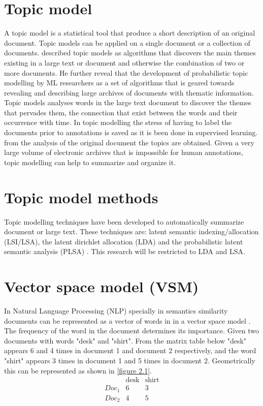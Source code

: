 \section{Topic model}  
A topic model is a statistical tool that produce a short description of an original document. Topic models can be applied on a single document or a collection of documents. \citep{blei2012surveying} described topic models as algorithms that discovers the main themes existing in a large text or document and otherwise the combination of two or more documents. He further reveal that the development of probabilistic topic modelling by ML  researchers as a set of algorithms that is geared towards revealing and describing large archives of documents with thematic information. Topic models analyses words in the large text document to discover the themes that pervades them, the connection that exist between the words and their occurrence with time. In topic modelling the stress of having to label the documents prior to annotations is saved as it is been done in supervised learning. from the analysis of the original document the topics are obtained. Given a very large volume of electronic archives that is impossible for human annotations, topic modelling can help to summarize and organize it.
\section{Topic model methods}
Topic modelling techniques have been developed to automatically summarize document or large text. These techniques are: latent semantic indexing/allocation  (LSI/LSA), the latent dirichlet allocation (LDA) and the probabilistic latent semantic analysis (PLSA) . This research will be restricted to LDA and LSA.
\section{Vector space model (VSM)}

In Natural Language Processing (NLP) specially in semantics similarity documents can be represented as a vector of words in in a vector space model \cite{salton1975vector}. The frequency of the word in the document determines its importance. Given two documents with words  "desk" and "shirt". From the matrix table below "desk" appears 6 and 4 times in document 1 and document 2 respectively, and the word "shirt" appears 3 times in document 1 and 5 times in document 2. Geometrically this can be represented as shown in \eqref{figure 2.1}.
$$\begin{array}{cccc}
 &\text{desk} & \text{shirt} \\ 
 Doc_1 & 6 & 3\\ 
 Doc_2 & 4 & 5
\end{array} $$

